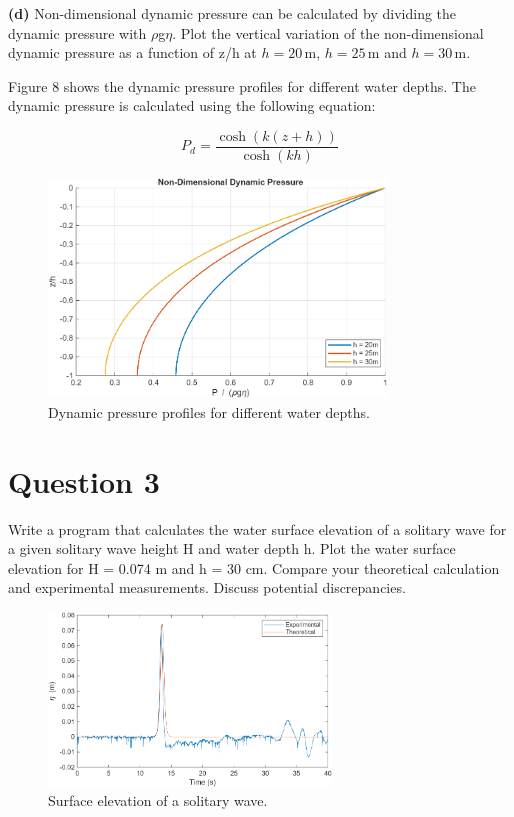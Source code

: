 \documentclass[a4paper]{article}
\begin{document}
\noindent\textbf{(d)} Non-dimensional dynamic pressure can be calculated by dividing the dynamic pressure with $\rho$g$\eta$. Plot the vertical variation of the non-dimensional dynamic pressure as a function of z/h at \( h = 20 \, \text{m} \), \( h = 25 \, \text{m} \) and \( h = 30 \, \text{m} \).
\vspace{0.3cm}

Figure 8 shows the dynamic pressure profiles for different water depths. The dynamic pressure is calculated using the following equation:

\[
P_d = \frac{\cosh(k(z+h))}{\cosh(kh)}
\]

\begin{figure}[H]
    \centering
    \includegraphics[width=0.8\textwidth]{CE591HW1-Q1d.png}
    \caption{\small Dynamic pressure profiles for different water depths.}
    \label{fig:plot2d}
\end{figure} 

\section{Question 3} Write a program that calculates the water surface elevation of a solitary wave for a given solitary wave height H and water depth h. Plot the water surface elevation for H = 0.074 m and h = 30 cm. Compare your theoretical calculation and experimental measurements. Discuss potential discrepancies.
\vspace{0.3cm}

\begin{figure}[H]
    \centering
    \includegraphics[width=0.67\textwidth]{CE591HW1-Q3.png}
    \caption{\small Surface elevation of a solitary wave.}
    \label{fig:plot3}
\end{figure} 
\end{document}

